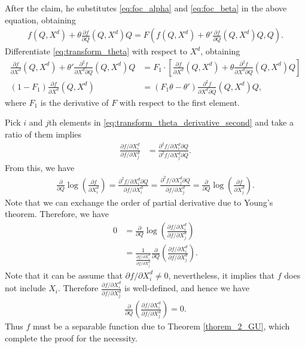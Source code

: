 \documentclass[11pt, a4paper]{article}
\theoremstyle{remark}
\begin{document}
After the claim, he substitutes \eqref{eq:foc_alpha} and \eqref{eq:foc_beta} in the above equation, obtaining
\begin{align}
    f(Q, X^{d}) + \theta \frac{\partial f}{\partial Q}(Q, X^{d})Q  = F\left(f(Q, X^{d}) + \theta' \frac{\partial f}{\partial Q}(Q, X^{d})Q, Q \right).
    \label{eq:transform_theta}
\end{align}
Differentiate \eqref{eq:transform_theta} with respect to $X^{d}$, obtaining
\begin{align}
\frac{\partial f}{\partial X^{d}}(Q, X^{d}) + \theta' \frac{\partial^2 f}{\partial X^{d} \partial Q}(Q, X^{d})Q &= F_{1} \cdot \left[\frac{\partial f}{\partial X^{d}}(Q, X^{d}) + \theta \frac{\partial^2 f}{\partial X^{d} \partial Q}(Q, X^{d})Q\right]\label{eq:transform_theta_derivative_first}\\
(1 - F_{1}) \frac{\partial f}{\partial X^{d}}(Q, X^{d}) & = (F_{1} \theta - \theta')\frac{\partial^2 f}{\partial X^{d} \partial Q}(Q, X^{d})Q,\label{eq:transform_theta_derivative_second}
\end{align}
where $F_1$ is the derivative of $F$ with respect to the first element.

Pick $i$ and $j$th elements in \eqref{eq:transform_theta_derivative_second} and take a ratio of them implies
\begin{align}
\frac{\partial f/\partial X^{d}_{i}}{\partial f/\partial X^{d}_{j}} & = \frac{\partial^2 f/\partial X^{d}_{i} \partial Q}{\partial^2 f/\partial X^{d}_{j} \partial Q}.\label{eq:ratio_foc}
\end{align}
From this, we have
\begin{align}
    \frac{\partial }{\partial Q} \log\left( \frac{\partial f}{\partial X^{d}_{i}}\right) = \frac{\partial^2 f/\partial X^{d}_{i} \partial Q}{\partial f/\partial X^{d}_{i}}  = \frac{\partial^2 f/\partial X^{d}_{j} \partial Q}{\partial f/\partial X^{d}_{j}} = \frac{\partial }{\partial Q} \log\left( \frac{\partial f}{\partial X^{d}_{j}}\right).
\end{align}
Note that we can exchange the order of partial derivative due to Young's theorem.
Therefore, we have
\begin{align}
    0 & = \frac{\partial}{\partial Q}\log\left(\frac{\partial f/\partial X^{d}_{i}}{\partial f/\partial X^{d}_{j}}\right)\\
    & = \frac{1}{\frac{\partial f/\partial X^{d}_{i}}{\partial f/\partial X^{d}_{j}}} \frac{\partial}{\partial Q} \left(\frac{\partial f/\partial X^{d}_{i}}{\partial f/\partial X^{d}_{j}}\right).
    \label{eq:derivative_separable}
\end{align}
Note that it can be assume that $\partial f/\partial X^{d}_{i}\ne 0$, nevertheless, it implies that $f$ does not include $X_{i}$.
Therefore  $\frac{\partial f/\partial X^{d}_{i}}{\partial f/\partial X^{d}_{j}}$ is well-defined, and hence we have 
\begin{align}
    \frac{\partial}{\partial Q} \left(\frac{\partial f/\partial X^{d}_{i}}{\partial f/\partial X^{d}_{j}}\right) = 0.
\end{align}
Thus $f$ must be a separable function due to Theorem \ref{thorem_2_GU}, which complete the proof for the necessity.
\end{document}
